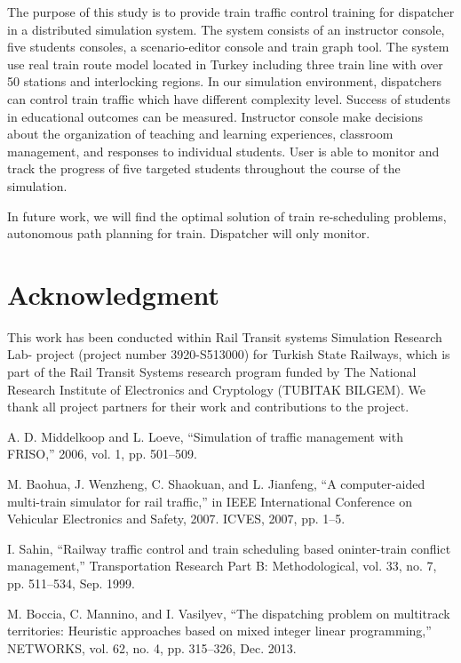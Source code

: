 \documentclass[conference]{IEEEtran}
\begin{document}
The purpose of this study is to provide train traffic control training for dispatcher in a distributed simulation system. The system consists of an instructor console, five students consoles, a scenario-editor console and train graph tool. The system use real train route model located in Turkey including three train line with over 50 stations and interlocking regions.  In our simulation environment, dispatchers can control train traffic which have different  complexity level. Success of students in educational outcomes can be measured. Instructor console make decisions about the organization of teaching and learning experiences, classroom management, and responses to individual students. User is able to monitor and track the progress of five targeted students throughout the course of the simulation.

In future work, we will find the optimal solution of train re-scheduling problems, autonomous path planning for train. Dispatcher will only monitor. 



\section*{Acknowledgment}


This work has been conducted within Rail Transit systems Simulation Research Lab- project (project number 3920-S513000) for Turkish State Railways, which is part of the Rail Transit Systems research program funded by The National Research Institute of Electronics and Cryptology (TUBITAK BILGEM). We thank all project partners for their work and contributions to the project.

\begin{thebibliography}{1}

A. D. Middelkoop and L. Loeve, “Simulation of traffic management with FRISO,” 2006, vol. 1, pp. 501–509.

M. Baohua, J. Wenzheng, C. Shaokuan, and L. Jianfeng, “A computer-aided multi-train simulator for rail traffic,” in IEEE International Conference on Vehicular Electronics and Safety, 2007. ICVES, 2007, pp. 1–5.

 I. Sahin, “Railway traffic control and train scheduling based oninter-train conflict management,” Transportation Research Part B: Methodological, vol. 33, no. 7, pp. 511–534, Sep. 1999.
 
M. Boccia, C. Mannino, and I. Vasilyev, “The dispatching problem on multitrack territories: Heuristic approaches based on mixed integer linear programming,” NETWORKS, vol. 62, no. 4, pp. 315–326, Dec. 2013. 
 

\end{thebibliography}




\end{document}

